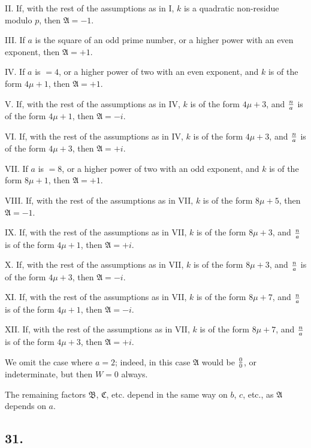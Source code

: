 \documentclass[twoside,12pt]{memoir}
\let\oldfrac\frac
\def\frac#1#2{\mathchoice{\tfrac{#1}{#2}}{\oldfrac{#1}{#2}}{\genfrac{}{}{}{2}{#1}{#2\mathstrut}}{\genfrac{}{}{}{3}{#1}{#2\mathstrut}}}
\begin{document}
II. If, with the rest of the assumptions as in I, \(k\) is a quadratic non-residue modulo \(p\), then \(\mathfrak{A}=-1\).
 
III. If \(a\) is the square of an odd prime number, or a higher power with an even exponent, then \(\mathfrak{A}=+1\).

IV. If \(a\) is \(=4\), or a higher power of two with an even exponent, and \(k\) is of the form \(4 \mu+1\), then \(\mathfrak{A}=+1\).
 
V. If, with the rest of the assumptions as in IV, \(k\) is of the form \(4 \mu+3\), and \(\frac{n}{a}\) is of the form \(4 \mu+1\), then \(\mathfrak{A}=-i\).
 
VI. If, with the rest of the assumptions as in IV, \(k\) is of the form \(4 \mu+3\), and \(\frac{n}{a}\) is of the form \(4 \mu+3\), then \(\mathfrak{A}=+i\).
 
VII. If \(a\) is \(=8\), or a higher power of two with an odd exponent, and \(k\) is of the form \(8 \mu+1\), then \(\mathfrak{A}=+1\).
 
VIII. If, with the rest of the assumptions as in VII, \(k\) is of the form \(8 \mu+5\), then \(\mathfrak{A}=-1\).
 
IX. If, with the rest of the assumptions as in VII, \(k\) is of the form \(8 \mu+3\), and \(\frac{n}{a}\) is of the form \(4 \mu+1\), then \(\mathfrak{A}=+i\).\pagebreak%
 
X. If, with the rest of the assumptions as in VII, \(k\) is of the form \(8 \mu+3\), and \(\frac{n}{a}\) is of the form \(4 \mu+3\), then \(\mathfrak{A}=-i\).
 
XI. If, with the rest of the assumptions as in VII, \(k\) is of the form \(8 \mu+7\), and \(\frac{n}{a}\) is of the form \(4 \mu+1\), then \(\mathfrak{A}=-i\).
 
XII. If, with the rest of the assumptions as in VII, \(k\) is of the form \(8 \mu+7\), and \(\frac{n}{a}\) is of the form \(4 \mu+3\), then \(\mathfrak{A}=+i\).
 
We omit the case where \(a=2\); indeed, in this case \(\mathfrak{A}\) would be \(\frac{0}{0}\), or indeterminate, but then \(W=0\) always.
 
The remaining factors \(\mathfrak{B}\), \(\mathfrak{C}\), etc{.} depend in the same way on \(b\), \(c\), etc{.}, as \(\mathfrak{A}\) depends on \(a\).

\subsection*{31.}
\end{document}

